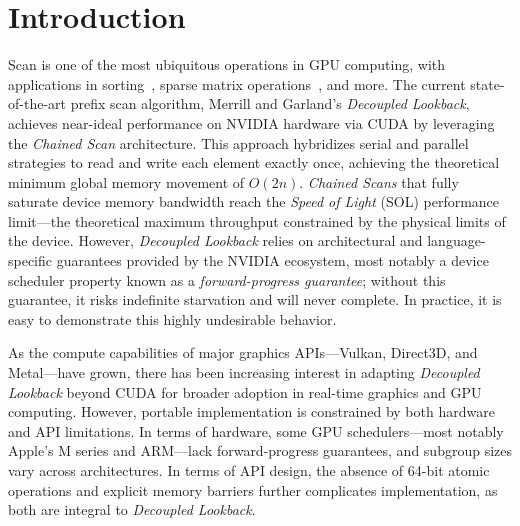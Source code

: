 \documentclass[acmsmall, manuscript, screen, review, anonymous]{acmart}
\begin{document}



\maketitle

\section{Introduction}
Scan is one of the most ubiquitous operations in GPU computing, with applications in sorting~\cite{adinets2022onesweepfastersignificantdigit}, sparse matrix operations~\cite{BellGarland2009}, and more. The current state-of-the-art prefix scan algorithm, Merrill and Garland's \emph{Decoupled Lookback}, achieves near-ideal performance on NVIDIA hardware via CUDA by leveraging the \emph{Chained Scan} architecture. This approach hybridizes serial and parallel strategies to read and write each element exactly once, achieving the theoretical minimum global memory movement of $O(2n)$. \emph{Chained Scans} that fully saturate device memory bandwidth reach the \emph{Speed of Light} (SOL) performance limit---the theoretical maximum throughput constrained by the physical limits of the device. However, \emph{Decoupled Lookback} relies on architectural and language-specific guarantees provided by the NVIDIA ecosystem, most notably a device scheduler property known as a \emph{forward-progress guarantee}; without this guarantee, it risks indefinite starvation and will never complete. In practice, it is easy to demonstrate this highly undesirable behavior.

As the compute capabilities of major graphics APIs---Vulkan, Direct3D, and Metal---have grown, there has been increasing interest in adapting \emph{Decoupled Lookback} beyond CUDA for broader adoption in real-time graphics and GPU computing. However, portable implementation is constrained by both hardware and API limitations. In terms of hardware, some GPU schedulers—most notably Apple's M series and ARM—lack forward-progress guarantees, and subgroup sizes vary across architectures. In terms of API design, the absence of 64-bit atomic operations and explicit memory barriers further complicates implementation, as both are integral to \emph{Decoupled Lookback}.
\end{document}
